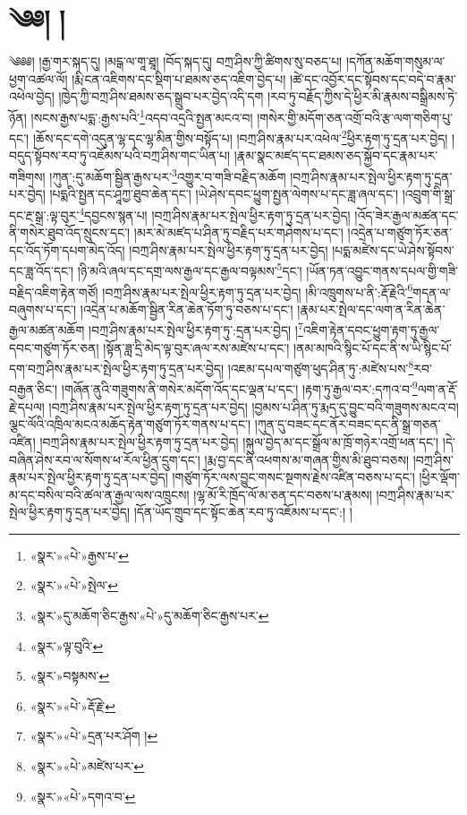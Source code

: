 \chapter{༄༅། །}༄༅༅། །རྒྱ་གར་སྐད་དུ། །མངྒ་ལ་གཱ་ཐཱ། །བོད་སྐད་དུ། བཀྲ་ཤིས་ཀྱི་ཚིགས་སུ་བཅད་པ། །དཀོན་མཆོག་གསུམ་ལ་ཕྱག་འཚལ་ལོ། །རྨི་ངན་འཇིགས་དང་སྡིག་པ་ཐམས་ཅད་འཇིག་བྱེད་པ། །ཚེ་དང་འབྱོར་དང་སྟོབས་དང་བདེ་བ་རྣམ་འཕེལ་བྱེད། །ཁྱེད་ཀྱི་བཀྲ་ཤིས་ཐམས་ཅད་སྒྲུབ་པར་བྱེད་འདི་དག །རབ་ཏུ་བརྗོད་ཀྱིས་དེ་ཕྱིར་མི་རྣམས་བསྒྲིམས་ཏེ་ཉོན། །སངས་རྒྱས་པདྨ་:རྒྱས་པའི་\footnote{«སྣར་»«པེ་»རྒྱས་པ་}འདབ་འདྲའི་སྤྱན་མངའ་བ། །གསེར་གྱི་མདོག་ཅན་འགྲོ་བའི་རྩ་ལག་གཅིག་པུ་དང་། །ཆོས་དང་དགེ་འདུན་ལྷ་དང་ལྷ་མིན་གྱིས་བསྟོད་པ། །བཀྲ་ཤིས་རྣམ་པར་འཕེལ་\footnote{«སྣར་»«པེ་»སྤེལ་}ཕྱིར་རྟག་ཏུ་དྲན་པར་བྱེད། །བདུད་སྟོབས་རབ་ཏུ་འཇོམས་པའི་བཀྲ་ཤིས་གང་ཡིན་པ། །རྣམ་སྣང་མཛད་དང་ཐམས་ཅད་སྐྱོབ་དང་རྣམ་པར་གཟིགས། །ཀུན་:དུ་མཆོག་སྦྱིན་རྒྱས་པར་\footnote{«སྣར་»དུ་མཆོག་ཅིང་རྒྱས་«པེ་»དུ་མཆོག་ཅིང་རྒྱས་པར་}འགྱུར་བ་གཟི་བརྗིད་མཆོག །བཀྲ་ཤིས་རྣམ་པར་སྤེལ་ཕྱིར་རྟག་ཏུ་དྲན་པར་བྱེད། །པདྨའི་སྤྱན་དང་ཤཱཀྱ་ཐུབ་ཆེན་དང་། །ཡེ་ཤེས་དབང་ཕྱུག་སྤྱན་ལེགས་པ་དང་ཟླ་ཞལ་དང་། །འབྲུག་གི་སྒྲ་དང་རྔ་སྒྲ་:ལྟ་བུར་\footnote{«སྣར་»ལྟ་བུའི་}དབྱངས་སྙན་པ། །བཀྲ་ཤིས་རྣམ་པར་སྤེལ་ཕྱིར་རྟག་ཏུ་དྲན་པར་བྱེད། །འོད་ཟེར་རྒྱལ་མཚན་དང་ནི་གསེར་ཐུབ་འོད་སྲུངས་དང་། །མར་མེ་མཛད་པ་ཤིན་ཏུ་བརྗིད་པར་གཤེགས་པ་དང་། །འདྲེན་པ་གཙུག་ཏོར་ཅན་དང་འོད་ཏོག་དཔག་མེད་འོད། །བཀྲ་ཤིས་རྣམ་པར་སྤེལ་ཕྱིར་རྟག་ཏུ་དྲན་པར་བྱེད། །པདྨ་མཛེས་དང་ཡེ་ཤེས་སྟོབས་དང་ཟླ་འོད་དང་། །ཉི་མའི་ཞལ་དང་དགྲ་ལས་རྒྱལ་དང་རྒྱལ་བལྟམས་\footnote{«སྣར་»བསྟམས་}དང་། །ཡོན་ཏན་འབྱུང་གནས་དཔལ་གྱི་གཟི་བརྗིད་འཇིག་རྟེན་གཙོ། །བཀྲ་ཤིས་རྣམ་པར་སྤེལ་ཕྱིར་རྟག་ཏུ་དྲན་པར་བྱེད། །མི་འཁྲུགས་པ་ནི་:རྡོ་རྗེའི་\footnote{«སྣར་»«པེ་»རྡོ་རྗེ་}གདན་ལ་བཞུགས་པ་དང་། །འདྲེན་པ་མཆོག་སྦྱིན་རིན་ཆེན་ཏོག་ཏུ་བཅས་པ་དང་། །རྣམ་པར་སྤེལ་དང་ལག་ན་རིན་ཆེན་རྒྱལ་མཚན་མཆོག །བཀྲ་ཤིས་རྣམ་པར་སྤེལ་ཕྱིར་རྟག་ཏུ་:དྲན་པར་བྱེད། །\footnote{«སྣར་»«པེ་»དྲན་པར་ཤོག །}འཇིག་རྟེན་དབང་ཕྱུག་རྟག་ཏུ་རྒྱལ་དབང་གཙུག་ཏོར་ཅན། །སྟོན་ཟླ་དྲི་མེད་ལྟ་བུར་ཞལ་རས་མཛེས་པ་དང་། །ནམ་མཁའི་སྙིང་པོ་དང་ནི་ས་ཡི་སྙིང་པོ་དག་བཀྲ་ཤིས་རྣམ་པར་སྤེལ་ཕྱིར་རྟག་ཏུ་དྲན་པར་བྱེད། །འཇམ་དཔལ་གཙུག་ཕུད་ཤིན་ཏུ་:མཛེས་པས་\footnote{«སྣར་»«པེ་»མཛེས་པར་}རབ་བརྒྱན་ཅིང་། །གཞོན་ནུའི་གཟུགས་ནི་གསེར་མདོག་འོད་དང་ལྡན་པ་དང་། །རྟག་ཏུ་རྒྱལ་བར་:དཀའ་བ་\footnote{«སྣར་»«པེ་»དགའ་བ་}ལག་ན་རྡོ་རྗེ་དཔལ། །བཀྲ་ཤིས་རྣམ་པར་སྤེལ་ཕྱིར་རྟག་ཏུ་དྲན་པར་བྱེད། །བྱམས་པ་ཤིན་ཏུ་རྨད་དུ་བྱུང་བའི་གཟུགས་མངའ་བ། ལྕང་ལོའི་འཁྲིལ་མངའ་མཆོད་རྟེན་གཙུག་ཏོར་གནས་པ་དང་། །ཀུན་དུ་བཟང་དང་ནོར་བཟང་དང་ནི་སྒྲ་གཅན་འཛིན། །བཀྲ་ཤིས་རྣམ་པར་སྤེལ་ཕྱིར་རྟག་ཏུ་དྲན་པར་བྱེད། །སྐུལ་བྱེད་མ་དང་སྒྲོལ་མ་ཁྲོ་གཉེར་འགྲོ་ཕན་དང་། །དེ་བཞིན་ཤེས་རབ་ལ་སོགས་ཕ་རོལ་ཕྱིན་དྲུག་དང་། །རྨ་བྱ་དང་ནི་འཕགས་མ་གཞན་གྱིས་མི་ཐུབ་བཅས། །བཀྲ་ཤིས་རྣམ་པར་སྤེལ་ཕྱིར་རྟག་ཏུ་དྲན་པར་བྱེད། །གཙུག་ཏོར་ལས་བྱུང་གསང་སྔགས་རྗེས་འཛིན་བཅས་པ་དང་། །ཕྱིར་ལྡོག་མ་དང་བསིལ་བའི་ཚལ་ན་རྒྱལ་ལས་འཁྲུངས། །ལྷ་མོ་རི་ཁྲོད་ལོ་མ་ཅན་དང་བཅས་པ་རྣམས། །བཀྲ་ཤིས་རྣམ་པར་སྤེལ་ཕྱིར་རྟག་ཏུ་དྲན་པར་བྱེད། །དོན་ཡོད་གྲུབ་དང་སྟོང་ཆེན་རབ་ཏུ་འཇོམས་པ་དང་:། །
